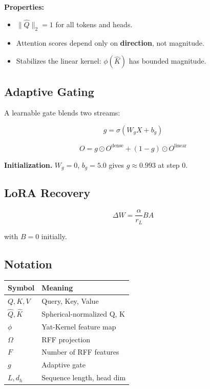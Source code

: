 \textbf{Properties:}

\begin{itemize}
\item $\|\hat{Q}\|_2 = 1$ for all tokens and heads.
\item Attention scores depend only on \textbf{direction}, not magnitude.
\item Stabilizes the linear kernel: $\phi(\hat{K})$ has bounded magnitude.

\end{itemize}
\subsection{Adaptive Gating}

A learnable gate blends two streams:

\begin{equation}
g = \sigma(W_g X + b_g)
\end{equation}

\begin{equation}
O = g \odot O^\text{dense} + (1 - g) \odot O^\text{linear}
\end{equation}

\textbf{Initialization.} $W_g = 0$, $b_g = 5.0$ gives $g \approx 
0.993$ at step 0.

\subsection{LoRA Recovery}

\begin{equation}
\Delta W = \frac{\alpha}{r_L} B A
\end{equation}

with $B = 0$ initially.

\subsection{Notation}

\begin{table}[H]
\centering
\small
\begin{tabular}{ll}
\toprule
\textbf{Symbol} & \textbf{Meaning} \\
\midrule
$Q, K, V$ & Query, Key, Value \\
$\hat{Q}, \hat{K}$ & Spherical-normalized Q, K \\
$\phi$ & Yat-Kernel feature map \\
$\Omega$ & RFF projection \\
$F$ & Number of RFF features \\
$g$ & Adaptive gate \\
$L, d_h$ & Sequence length, head dim \\
\bottomrule
\end{tabular}
\end{table}

